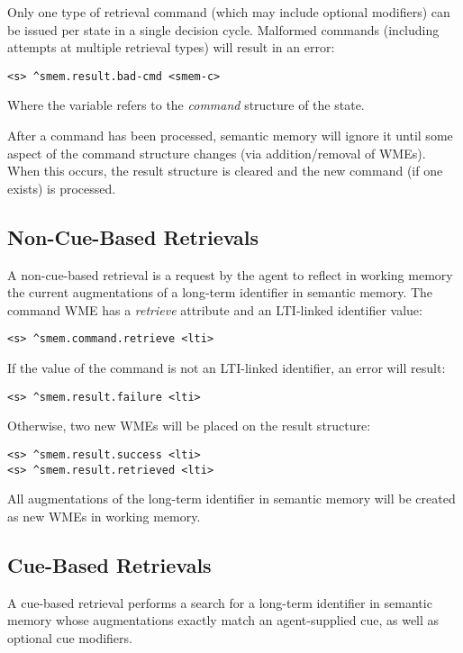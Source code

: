 Only one type of retrieval command (which may include optional modifiers) can be issued per state in a single decision cycle.  
Malformed commands (including attempts at multiple retrieval types) will result in an error:

\begin{verbatim}
<s> ^smem.result.bad-cmd <smem-c>
\end{verbatim}

Where the  variable refers to the \emph{command} structure of the state.

After a command has been processed, semantic memory will ignore it until some aspect of the command structure changes (via addition/removal of WMEs).  
When this occurs, the result structure is cleared and the new command (if one exists) is processed.

\subsection{Non-Cue-Based Retrievals}
A non-cue-based retrieval is a request by the agent to reflect in working memory the current augmentations of a long-term identifier in semantic memory. 
The command WME has a \emph{retrieve} attribute and an LTI-linked identifier value:

\begin{verbatim}
<s> ^smem.command.retrieve <lti>
\end{verbatim}

If the value of the command is not an LTI-linked identifier, an error will result: 

\begin{verbatim}
<s> ^smem.result.failure <lti>
\end{verbatim}

Otherwise, two new WMEs will be placed on the result structure:

\begin{verbatim}
<s> ^smem.result.success <lti>
<s> ^smem.result.retrieved <lti>
\end{verbatim}

All augmentations of the long-term identifier in semantic memory will be created as new WMEs in working memory.

\subsection{Cue-Based Retrievals}
A cue-based retrieval performs a search for a long-term identifier in semantic memory whose augmentations exactly match an agent-supplied cue, as well as optional cue modifiers.

